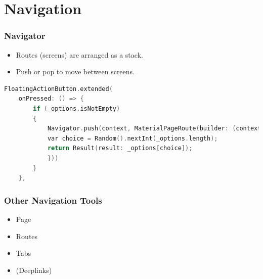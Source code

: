 \documentclass[compress, aspectratio=32]{beamer}
\begin{document}
\section{Navigation}
\begin{frame}[fragile]
    \frametitle{Navigator}
    \begin{itemize}
        \item Routes (screens) are arranged as a stack.
        \item Push or pop to move between screens.
    \end{itemize}
    \begin{lstlisting}[language=c, firstnumber=80]
FloatingActionButton.extended(
    onPressed: () => {
        if (_options.isNotEmpty)
        {
            Navigator.push(context, MaterialPageRoute(builder: (context) {
            var choice = Random().nextInt(_options.length);
            return Result(result: _options[choice]);
            }))
        }
    },
    \end{lstlisting}
\end{frame}

\begin{frame}
\frametitle{Other Navigation Tools}
\begin{itemize}
    \item Page
    \item Routes
    \item Tabs
    \item (Deeplinks)
\end{itemize}
\end{frame}
\end{document}
